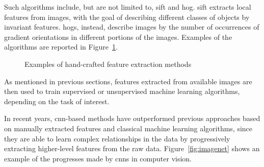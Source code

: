 \documentclass[%
    corpo=12pt,
    twoside,
    stile=classica,   
    tipotesi=magistrale,
    evenboxes,
    english,
	numerazioneromana,
]{toptesi}
\begin{document}
Such algorithms include, but are not limited to, \gls{sift} and \gls{hog}. \Gls{sift} extracts local features from images, with the goal of describing different classes of objects by invariant features\cite{lowe1999object}. \Glspl{hog}, instead, describe images by the number of occurrences of gradient orientations in different portions of the images\cite{dalal2005histograms}. Examples of the algorithms are reported in Figure~\ref{fig:sift_hog}.

\begin{figure}[ht]
	\centering
	\caption{Examples of hand-crafted feature extraction methods}
	\label{fig:sift_hog}
\end{figure}

As mentioned in previous sections, features extracted from available images are then used to train supervised or unsupervised machine learning algorithms, depending on the task of interest.

\medskip
In recent years, \gls{cnn}-based methods have outperformed previous approaches based on manually extracted features and classical machine learning algorithms, since they are able to learn complex relationships in the data by progressively extracting higher-level features from the raw data.
Figure~\ref{fig:imagenet} shows an example of the progresses made by \glspl{cnn} in computer vision.
\end{document}
